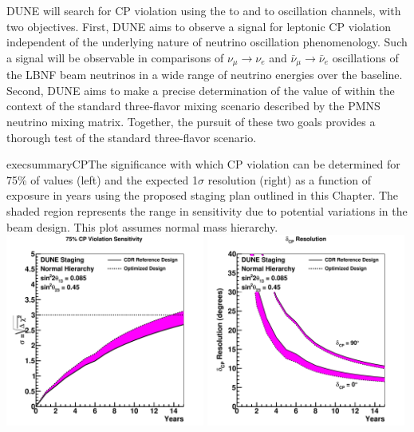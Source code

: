 DUNE will search for CP violation using the \numu to \nue and \anumu
to \anue oscillation channels, with two objectives.  First, DUNE aims
to observe a signal for leptonic CP violation independent of the
underlying nature of neutrino oscillation phenomenology. Such a signal
will be observable in comparisons of $\nu_\mu \rightarrow \nu_e$ and
$\bar{\nu}_{\mu} \rightarrow \bar{\nu}_e$ oscillations of the LBNF
beam neutrinos in a wide range of neutrino energies over the
 baseline.
Second,
DUNE aims to make a precise determination of the value of \deltacp
within the context of the standard three-flavor mixing scenario
described by the PMNS neutrino mixing matrix. Together, the pursuit of
these two goals provides a thorough test of the standard three-flavor
scenario. 
%
\begin{cdrfigure}{execsummaryCP}{The
    significance with which CP violation can be determined for 75\% of
    \deltacp values (left) and the expected 1$\sigma$ resolution
    (right) as a function of exposure in years using the proposed
    staging plan outlined in this Chapter. The shaded region
    represents the range in sensitivity due to potential variations in
    the beam design. This plot assumes normal mass hierarchy.}
\includegraphics[width=0.49\textwidth]{volume-physics/figures/cpv75_exp_staging15yr}
 \includegraphics[width=0.49\textwidth]{volume-physics/figures/dcp_exp_staging.pdf}
\end{cdrfigure}

